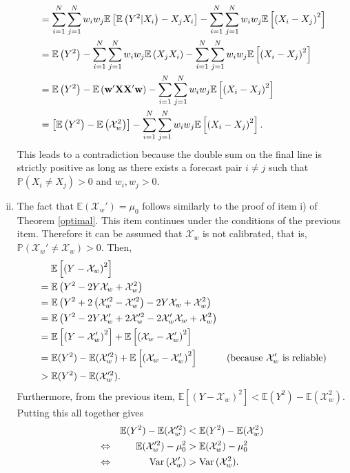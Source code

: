 \documentclass[12pt]{article}
\renewcommand{\P}{\mathbb{P}}
\newcommand{\E}{\mathbb{E}}
\theoremstyle{definition}
\theoremstyle{definition}
\def\w{{\bf w}}
\def\X{{\bf X}}
\def\P{{\mathbb P}}
\def\E{{\mathbb E}}
\def\Var{{\rm Var}\,}
\begin{document}
\begin{enumerate}[i)]
\begin{align*}
&= \sum_{i=1}^N\sum_{j=1}^Nw_iw_j \E\left[\E\left(Y^2|X_i\right) -X_jX_i\right]-\sum_{i=1}^N\sum_{j=1}^Nw_iw_j\E\left[\left(X_i-X_j\right)^2\right] \\
&=  \E\left(Y^2\right) - \sum_{i=1}^N\sum_{j=1}^Nw_iw_j \E\left(X_jX_i\right)-\sum_{i=1}^N\sum_{j=1}^Nw_iw_j\E\left[\left(X_i-X_j\right)^2\right] \\
&=  \E\left(Y^2\right) -  \E\left(\w'\X \X'\w\right)-\sum_{i=1}^N\sum_{j=1}^Nw_iw_j\E\left[\left(X_i-X_j\right)^2\right] \\
&= \left[\E\left(Y^2\right) -  \E\left(\mathcal{X}_w^2\right) \right]-\sum_{i=1}^N\sum_{j=1}^Nw_iw_j\E\left[\left(X_i-X_j\right)^2\right].
\end{align*}
This leads to a contradiction because the double sum on the final line is strictly positive as long as there exists a forecast pair $i \neq j$ such that $\P(X_i \neq X_j) > 0$ and $w_i, w_j > 0$. 

\item The fact that $\E(\mathcal{X}_w') = \mu_0$ follows similarly to the proof of item i) of Theorem \ref{optimal}. This item continues under the conditions of the previous item. Therefore it can be assumed that $\mathcal{X}_w$ is not calibrated, that is, $\P(\mathcal{X}_w' \neq \mathcal{X}_w) > 0$. Then,
\begin{align*}
&\hspace{1.3em}   \E \left[ \left( Y - \mathcal{X}_w\right)^2\right]\\
 &= \E \left( Y^2 - 2Y\mathcal{X}_w + \mathcal{X}_w^2\right)\\
&= \E \left( Y^2 + 2\left(\mathcal{X}_w'^2-\mathcal{X}_w'^2\right)- 2Y\mathcal{X}_w + \mathcal{X}_w^2\right)\\
&= \E \left( Y^2 -2Y\mathcal{X}_w'+2\mathcal{X}_w'^2- 2\mathcal{X}_w'\mathcal{X}_w + \mathcal{X}_w^2\right)\\
&= \E\left[\left(Y-\mathcal{X}_w'\right)^2\right] + \E\left[\left(\mathcal{X}_w-\mathcal{X}_w'\right)^2\right] \\
&= \E(Y^2)-\E(\mathcal{X}_w'^2) + \E\left[\left(\mathcal{X}_w-\mathcal{X}_w'\right)^2\right] & \text{(because $\mathcal{X}_w'$ is reliable)}\\
&> \E(Y^2)-\E(\mathcal{X}_w'^2).
\end{align*}
Furthermore, from the previous item, $\E \left[ \left( Y - \mathcal{X}_w\right)^2\right] < \E(Y^2)-\E(\mathcal{X}_w^2)$. Putting this all together gives
\begin{align*}
&&\E(Y^2)-\E(\mathcal{X}_w'^2)  &< \E(Y^2)-\E(\mathcal{X}_w^2)\\
\Leftrightarrow && \E(\mathcal{X}_w'^2) - \mu_0^2  &> \E(\mathcal{X}_w^2) - \mu_0^2\\
\Leftrightarrow && \Var(\mathcal{X}_w')  &> \Var(\mathcal{X}_w^2).
\end{align*}



\end{enumerate}
\end{document}

